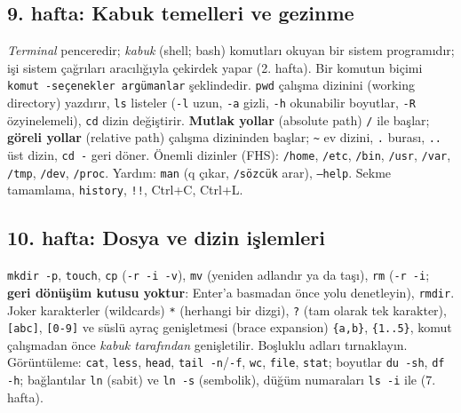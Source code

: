 \documentclass[11pt,a4paper]{article}
\newcommand{\term}[1]{\textbf{\color{mintdeep}#1}}
\newcommand{\cmd}[1]{\texttt{#1}}
\begin{document}
\subsection{9. hafta: Kabuk temelleri ve gezinme}
\emph{Terminal} penceredir; \emph{kabuk} (shell; bash) komutları okuyan bir sistem programıdır; işi sistem çağrıları aracılığıyla çekirdek yapar (2. hafta). Bir komutun biçimi \texttt{komut -seçenekler argümanlar} şeklindedir. \cmd{pwd} çalışma dizinini (working directory) yazdırır, \cmd{ls} listeler (\cmd{-l} uzun, \cmd{-a} gizli, \cmd{-h} okunabilir boyutlar, \cmd{-R} özyinelemeli), \cmd{cd} dizin değiştirir. \term{Mutlak yollar} (absolute path) \texttt{/} ile başlar; \term{göreli yollar} (relative path) çalışma dizininden başlar; \texttt{\textasciitilde} ev dizini, \texttt{.} burası, \texttt{..} üst dizin, \cmd{cd -} geri döner. Önemli dizinler (FHS): \texttt{/home}, \texttt{/etc}, \texttt{/bin}, \texttt{/usr}, \texttt{/var}, \texttt{/tmp}, \texttt{/dev}, \texttt{/proc}. Yardım: \cmd{man} (q çıkar, \texttt{/sözcük} arar), \cmd{--help}. Sekme tamamlama, \cmd{history}, \cmd{!!}, Ctrl+C, Ctrl+L.


\subsection{10. hafta: Dosya ve dizin işlemleri}
\cmd{mkdir -p}, \cmd{touch}, \cmd{cp} (\cmd{-r -i -v}), \cmd{mv} (yeniden adlandır ya da taşı), \cmd{rm} (\cmd{-r -i}; \textbf{geri dönüşüm kutusu yoktur}: Enter'a basmadan önce yolu denetleyin), \cmd{rmdir}. Joker karakterler (wildcards) \texttt{*} (herhangi bir dizgi), \texttt{?} (tam olarak tek karakter), \texttt{[abc]}, \texttt{[0-9]} ve süslü ayraç genişletmesi (brace expansion) \texttt{\{a,b\}}, \texttt{\{1..5\}}, komut çalışmadan önce \emph{kabuk tarafından} genişletilir. Boşluklu adları tırnaklayın. Görüntüleme: \cmd{cat}, \cmd{less}, \cmd{head}, \cmd{tail -n}/\cmd{-f}, \cmd{wc}, \cmd{file}, \cmd{stat}; boyutlar \cmd{du -sh}, \cmd{df -h}; bağlantılar \cmd{ln} (sabit) ve \cmd{ln -s} (sembolik), düğüm numaraları \cmd{ls -i} ile (7. hafta).

\end{document}
